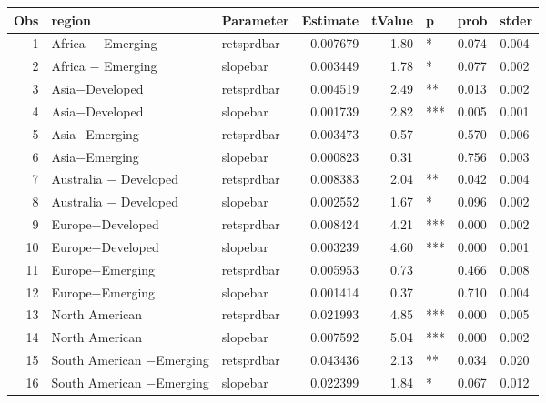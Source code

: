 

\begin{longtable}{|r|l|l|r|r|l|l|l|}\hline
   Obs &    region &    Parameter &    Estimate &    tValue &    p &    prob &    stder\\\hline
\endhead
   1 &    Africa $-$ Emerging &    retsprdbar &    0.007679 &    1.80 &    * &    0.074 &    0.004\\\hline
   2 &    Africa $-$ Emerging &    slopebar &    0.003449 &    1.78 &    * &    0.077 &    0.002\\\hline
   3 &    Asia$-$Developed &    retsprdbar &    0.004519 &    2.49 &    ** &    0.013 &    0.002\\\hline
   4 &    Asia$-$Developed &    slopebar &    0.001739 &    2.82 &    *** &    0.005 &    0.001\\\hline
   5 &    Asia$-$Emerging &    retsprdbar &    0.003473 &    0.57 &      &    0.570 &    0.006\\\hline
   6 &    Asia$-$Emerging &    slopebar &    0.000823 &    0.31 &      &    0.756 &    0.003\\\hline
   7 &    Australia $-$ Developed &    retsprdbar &    0.008383 &    2.04 &    ** &    0.042 &    0.004\\\hline
   8 &    Australia $-$ Developed &    slopebar &    0.002552 &    1.67 &    * &    0.096 &    0.002\\\hline
   9 &    Europe$-$Developed &    retsprdbar &    0.008424 &    4.21 &    *** &    0.000 &    0.002\\\hline
   10 &    Europe$-$Developed &    slopebar &    0.003239 &    4.60 &    *** &    0.000 &    0.001\\\hline
   11 &    Europe$-$Emerging &    retsprdbar &    0.005953 &    0.73 &      &    0.466 &    0.008\\\hline
   12 &    Europe$-$Emerging &    slopebar &    0.001414 &    0.37 &      &    0.710 &    0.004\\\hline
   13 &    North American &    retsprdbar &    0.021993 &    4.85 &    *** &    0.000 &    0.005\\\hline
   14 &    North American &    slopebar &    0.007592 &    5.04 &    *** &    0.000 &    0.002\\\hline
   15 &    South American $-$Emerging &    retsprdbar &    0.043436 &    2.13 &    ** &    0.034 &    0.020\\\hline
   16 &    South American $-$Emerging &    slopebar &    0.022399 &    1.84 &    * &    0.067 &    0.012\\\hline
\end{longtable}

